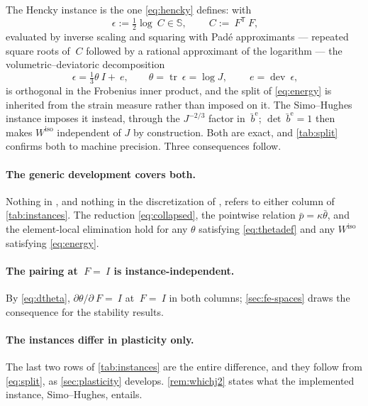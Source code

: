 \documentclass{article}
\newcommand{\F}{~F}
\newcommand{\C}{~C}
\newcommand{\Id}{~I}
\newcommand{\eps}{~\epsilon}
\newcommand{\edev}{~e}
\newcommand{\Syms}{\mathbb{S}}
\newcommand{\dev}{\operatorname{dev}}
\newcommand{\trace}{\operatorname{tr}}
\newcommand{\transpose}[1]{#1^{\mathsf{T}}}
\newcommand{\supiso}{^{\mathrm{iso}}}
\theoremstyle{definition}
\theoremstyle{plain}
\begin{document}
The Hencky instance is the one \eqref{eq:hencky} defines: with
\begin{equation}
  \label{eq:hencky}
  \eps := \tfrac{1}{2}\log\C \in \Syms,
  \qquad \C := \transpose{\F}\F,
\end{equation}
evaluated by inverse scaling and squaring with Pad\'e approximants --- repeated
square roots of $\C$ followed by a rational approximant of the logarithm
\cite{AlMohy.Higham.Relton:2013} --- the
volumetric--deviatoric decomposition
\begin{equation}
  \label{eq:split}
  \eps = \tfrac{1}{3}\theta\Id + \edev,
  \qquad \theta = \trace\eps = \log J,
  \qquad \edev = \dev\eps,
\end{equation}
is orthogonal in the Frobenius inner product, and the split of
\eqref{eq:energy} is inherited from the strain measure rather than imposed on
it. The Simo--Hughes instance imposes it instead, through the $J^{-2/3}$ factor
in $\bar{~b}^{\mathrm e}$; $\det\bar{~b}^{\mathrm e} = 1$ then makes
$W\supiso$ independent of $J$ by construction. Both are exact, and
\cref{tab:split} confirms both to machine precision. Three consequences
follow.

\paragraph{The generic development covers both.} Nothing in
, and nothing in the
discretization of , refers to either
column of \cref{tab:instances}. The reduction \eqref{eq:collapsed}, the
pointwise relation $\bar p = \kappa\bar\theta$, and the element-local
elimination hold for any $\theta$ satisfying \eqref{eq:thetadef} and any
$W\supiso$ satisfying \eqref{eq:energy}.

\paragraph{The pairing at $\F = \Id$ is instance-independent.} By
\eqref{eq:dtheta}, $\partial\theta/\partial\F = \Id$ at $\F = \Id$ in both
columns; \cref{sec:fe-spaces} draws the consequence for the stability
results.

\paragraph{The instances differ in plasticity only.} The last two rows of
\cref{tab:instances} are the entire difference, and they follow from
\eqref{eq:split}, as \cref{sec:plasticity} develops. \cref{rem:whichj2}
states what the implemented instance, Simo--Hughes, entails.
\end{document}
